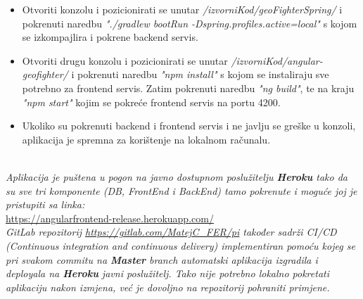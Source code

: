 \begin{itemize}
				
				\item Otvoriti konzolu i pozicionirati se unutar \textit{/izvorniKod/geoFighterSpring/} i pokrenuti naredbu \textit{"./gradlew bootRun -Dspring.profiles.active=local"} s kojom se izkompajlira i pokrene backend servis.
				
				\item Otvoriti drugu konzolu i pozicionirati se unutar \textit{/izvorniKod/angular-geofighter/} i pokrenuti naredbu \textit{"npm install"} s kojom se instaliraju sve potrebno za frontend servis. Zatim pokrenuti naredbu \textit{"ng build"}, te na kraju \textit{"npm start"} kojim se pokreće frontend servis na portu 4200.
				
				\item Ukoliko su pokrenuti backend i frontend servis i ne javlju se greške u konzoli, aplikacija je spremna za korištenje na lokalnom računalu.\\\\
				
			\end{itemize}
		
			
			\textit{Aplikacija je puštena u pogon na javno dostupnom poslužitelju \textbf{Heroku} tako da su sve tri komponente (DB, FrontEnd i BackEnd) tamo pokrenute i moguće joj je pristupiti sa linka:}\\
			\url{https://angularfrontend-release.herokuapp.com/}\\
						
			\textit{GitLab repozitorij \url{https://gitlab.com/MatejC_FER/pi} također sadrži CI/CD (Continuous integration and continuous delivery) implementiran pomoću kojeg se pri svakom commitu na \textbf{Master} branch automatski aplikacija izgradila i deployala na \textbf{Heroku} javni poslužitelj. Tako nije potrebno lokalno pokretati aplikaciju nakon izmjena, već je dovoljno na repozitorij pohraniti primjene.}
			
			
			\eject 